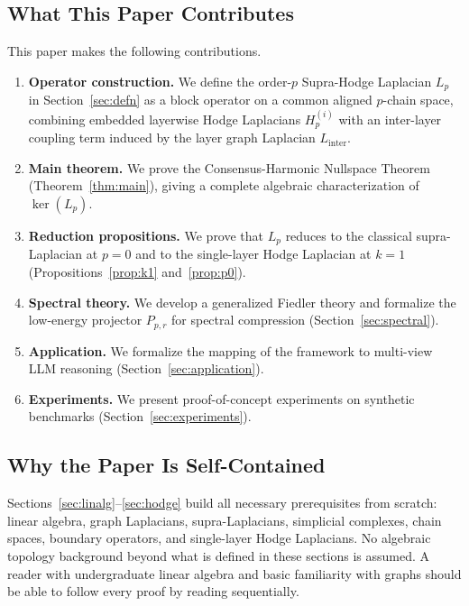 \documentclass[11pt]{article}
\theoremstyle{definition}
\theoremstyle{remark}
\begin{document}
\subsection{What This Paper Contributes}
\label{subsec:contributions}

This paper makes the following contributions.
\begin{enumerate}
\item \textbf{Operator construction.} We define the order-$p$ Supra-Hodge
      Laplacian $L_p$ in Section~\ref{sec:defn} as a block operator on a common
      aligned $p$-chain space, combining embedded layerwise Hodge Laplacians
      $H_p^{(i)}$ with an inter-layer coupling term induced by the layer graph
      Laplacian $L_{\mathrm{inter}}$.
\item \textbf{Main theorem.} We prove the Consensus-Harmonic Nullspace
      Theorem (Theorem~\ref{thm:main}), giving a complete algebraic
      characterization of $\ker(L_p)$.
\item \textbf{Reduction propositions.} We prove that $L_p$ reduces to the
      classical supra-Laplacian at $p=0$ and to the single-layer Hodge
      Laplacian at $k=1$ (Propositions~\ref{prop:k1} and~\ref{prop:p0}).
\item \textbf{Spectral theory.} We develop a generalized Fiedler theory and
      formalize the low-energy projector $P_{p,r}$ for spectral compression
      (Section~\ref{sec:spectral}).
\item \textbf{Application.} We formalize the mapping of the framework to
      multi-view LLM reasoning (Section~\ref{sec:application}).
\item \textbf{Experiments.} We present proof-of-concept experiments on
      synthetic benchmarks (Section~\ref{sec:experiments}).
\end{enumerate}

\subsection{Why the Paper Is Self-Contained}
\label{subsec:selfcontained}

Sections~\ref{sec:linalg}--\ref{sec:hodge} build all necessary prerequisites
from scratch: linear algebra, graph Laplacians, supra-Laplacians, simplicial
complexes, chain spaces, boundary operators, and single-layer Hodge Laplacians.
No algebraic topology background beyond what is defined in these sections is
assumed. A reader with undergraduate linear algebra and basic familiarity with
graphs should be able to follow every proof by reading sequentially.
\end{document}
